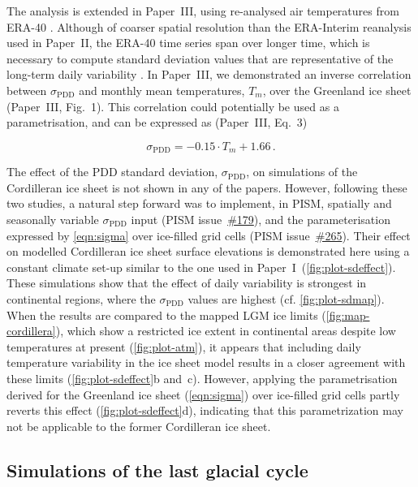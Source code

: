 \documentclass[a4paper]{kappa}
\newcommand{\sPDD}[0]{\sigma_{\mathrm{PDD}}}
\newcommand{\CCLI}[0]{Paper~I}      %
\newcommand{\PSDV}[0]{Paper~II}     %
\newcommand{\PSDP}[0]{Paper~III}    %
\newcommand{\issue}[1]{\href{https://github.com/pism/pism/issues/#1}{\##1}}
\begin{document}
The analysis is extended in \PSDP, using re-analysed air
temperatures from ERA-40 \citep{Uppala.etal.2005}. Although of coarser spatial
resolution than the ERA-Interim reanalysis used in \PSDV, the ERA-40 time
series span over longer time, which is necessary to compute standard deviation
values that are representative of the long-term daily variability
\citep{Rogozhina.Rau.2014}. In \PSDP, we demonstrated an inverse correlation
between $\sPDD$ and monthly mean temperatures, $T_m$, over the Greenland ice
sheet (\PSDP, Fig.~1). This correlation could potentially be used as a
parametrisation, and can be expressed as (\PSDP, Eq.~3)

\begin{equation}
    \label{eqn:sigma}
    \sPDD = -0.15 \cdot T_{m} + 1.66\,.
\end{equation}

The effect of the PDD standard deviation, $\sPDD$, on simulations of the
Cordilleran ice sheet is not shown in any of the papers. However, following
these two studies, a natural step forward was to implement, in PISM, spatially
and seasonally variable $\sPDD$ input (PISM issue~\issue{179}), and the
parameterisation expressed by \cref{eqn:sigma} over ice-filled grid cells
(PISM issue~\issue{265}). Their effect on modelled Cordilleran ice sheet
surface elevations is demonstrated here using a constant climate set-up similar
to the one used in \CCLI\ (\cref{fig:plot-sdeffect}). These simulations show
that the effect of daily variability is strongest in continental regions, where
the $\sPDD$ values are highest (cf. \cref{fig:plot-sdmap}). When the results
are compared to the mapped LGM ice limits (\cref{fig:map-cordillera}), which show
a restricted ice extent in continental areas despite low temperatures at
present (\cref{fig:plot-atm}), it appears that including daily temperature
variability in the ice sheet model results in a closer agreement with these
limits (\cref{fig:plot-sdeffect}b and~c). However, applying the parametrisation
derived for the Greenland ice sheet (\cref{eqn:sigma}) over ice-filled grid
cells partly reverts this effect (\cref{fig:plot-sdeffect}d), indicating that
this parametrization may not be applicable to the former Cordilleran ice sheet.


\subsection{Simulations of the last glacial cycle}
\label{sec:ccyc}
\end{document}
